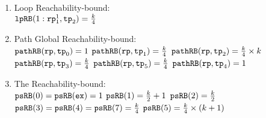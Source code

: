 \begin{enumerate}
    \item Loop Reachability-bound:
    \\
    $\mathtt{lpRB}(1: \mathtt{rp}_1^1, \mathtt{tp}_2) = \frac{k}{4}$ \quad
    \item Path Global Reachability-bound:
    \\
    $\mathtt{pathRB}(\mathtt{rp}, \mathtt{tp}_0) = 1$ \quad
    $\mathtt{pathRB}(\mathtt{rp}, \mathtt{tp}_1) = \frac{k}{4}$ \quad
    $\mathtt{pathRB}(\mathtt{rp}, \mathtt{tp}_2) = \frac{k}{4} \times k$ \\
    $\mathtt{pathRB}(\mathtt{rp}, \mathtt{tp}_3) = \frac{k}{4}$ \quad
    $\mathtt{pathRB}(\mathtt{rp}, \mathtt{tp}_5) = \frac{k}{4}$ \quad
    $\mathtt{pathRB}(\mathtt{rp}, \mathtt{tp}_4) = 1$
    \item The Reachability-bound:
    \\
    $\mathtt{psRB}(0) = \mathtt{psRB}(\mathtt{ex}) = 1$ \quad
    $\mathtt{psRB}(1) = \frac{k}{2} + 1$ \quad
    $\mathtt{psRB}(2) = \frac{k}{2} $ \\
    $\mathtt{psRB}(3) = \mathtt{psRB}(4) = \mathtt{psRB}(7) = \frac{k}{4} $ \quad
     \quad
    $\mathtt{psRB}(5) =  \frac{k}{4} \times (k + 1)$
  \end{enumerate}